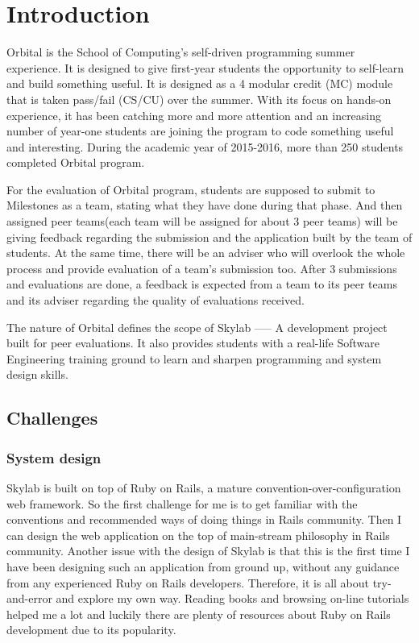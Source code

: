 \chapter{Introduction}

Orbital is the School of Computing’s self-driven programming summer experience. It is designed to give first-year students the opportunity to self-learn and build something useful. It is designed as a 4 modular credit (MC) module that is taken pass/fail (CS/CU) over the summer. With its focus on hands-on experience, it has been catching more and more attention and an increasing number of year-one students are joining the program to code something useful and interesting. During the academic year of 2015-2016, more than 250 students completed Orbital program.

For the evaluation of Orbital program, students are supposed to submit to Milestones as a team, stating what they have done during that phase. And then assigned peer teams(each team will be assigned for about 3 peer teams) will be giving feedback regarding the submission and the application built by the team of students. At the same time, there will be an adviser who will overlook the whole process and provide evaluation of a team's submission too. After 3 submissions and evaluations are done, a feedback is expected from a team to its peer teams and its adviser regarding the quality of evaluations received.

The nature of Orbital defines the scope of Skylab —-- A development project built for peer evaluations. It also provides students with a real-life Software Engineering training ground to learn and sharpen programming and system design skills. 

\section{Challenges}

\subsection{System design}
Skylab is built on top of Ruby on Rails, a mature convention-over-configuration web framework. So the first challenge for me is to get familiar with the conventions and recommended ways of doing things in Rails community. Then I can design the web application on the top of main-stream philosophy in Rails community. Another issue with the design of Skylab is that this is the first time I have been designing such an application from ground up, without any guidance from any experienced Ruby on Rails developers. Therefore, it is all about try-and-error and explore my own way. Reading books and browsing on-line tutorials helped me a lot and luckily there are plenty of resources about Ruby on Rails development due to its popularity.

